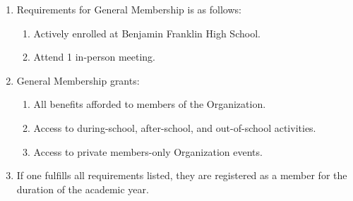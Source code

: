 
\begin{enumerate}
	\item Requirements for General Membership is as follows:
		\begin{enumerate}
			\item Actively enrolled at Benjamin Franklin High School.

			\item Attend 1 in-person meeting.
		\end{enumerate}

	\item General Membership grants:
		\begin{enumerate}
			\item All benefits afforded to members of the Organization.

			\item Access to during-school, after-school, and out-of-school activities.

			\item Access to private members-only Organization events.
		\end{enumerate}

	\item If one fulfills all requirements listed, they are registered as a member
		for the duration of the academic year.
\end{enumerate}

